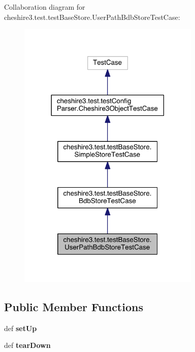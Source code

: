 Collaboration diagram for cheshire3.\-test.\-test\-Base\-Store.\-User\-Path\-Bdb\-Store\-Test\-Case\-:
\nopagebreak
\begin{figure}[H]
\begin{center}
\leavevmode
\includegraphics[width=246pt]{classcheshire3_1_1test_1_1test_base_store_1_1_user_path_bdb_store_test_case__coll__graph}
\end{center}
\end{figure}
\subsection*{Public Member Functions}
\begin{DoxyCompactItemize}
\item 
\hypertarget{classcheshire3_1_1test_1_1test_base_store_1_1_user_path_bdb_store_test_case_a2255850f283668f2b8ee7b382557973b}{def {\bfseries set\-Up}}\label{classcheshire3_1_1test_1_1test_base_store_1_1_user_path_bdb_store_test_case_a2255850f283668f2b8ee7b382557973b}

\item 
\hypertarget{classcheshire3_1_1test_1_1test_base_store_1_1_user_path_bdb_store_test_case_a4db7a11ecbcbf77407fdc0d6c93ddd77}{def {\bfseries tear\-Down}}\label{classcheshire3_1_1test_1_1test_base_store_1_1_user_path_bdb_store_test_case_a4db7a11ecbcbf77407fdc0d6c93ddd77}

\end{DoxyCompactItemize}
